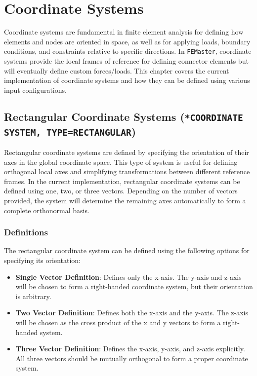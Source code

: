 \chapter{Coordinate Systems}
\label{chap:coordinate_systems}

Coordinate systems are fundamental in finite element analysis for defining how elements and nodes are oriented in space,
as well as for applying loads, boundary conditions, and constraints relative to specific directions.
In \texttt{FEMaster}, coordinate systems provide the local frames of reference for defining connector elements but will eventually define custom forces/loads.
This chapter covers the current implementation of coordinate systems and how they can be defined using various input configurations.

\section{Rectangular Coordinate Systems (\texttt{*COORDINATE SYSTEM, TYPE=RECTANGULAR})}

Rectangular coordinate systems are defined by specifying the orientation of their axes in the global coordinate space.
This type of system is useful for defining orthogonal local axes and simplifying transformations between different reference frames. In the current implementation, rectangular coordinate systems can be defined using one, two, or three vectors. Depending on the number of vectors provided, the system will determine the remaining axes automatically to form a complete orthonormal basis.

\subsection{Definitions}

The rectangular coordinate system can be defined using the following options for specifying its orientation:

\begin{itemize}
    \item \textbf{Single Vector Definition}: Defines only the x-axis. The y-axis and z-axis will be chosen to form a right-handed coordinate system, but their orientation is arbitrary.
    \item \textbf{Two Vector Definition}: Defines both the x-axis and the y-axis. The z-axis will be chosen as the cross product of the x and y vectors to form a right-handed system.
    \item \textbf{Three Vector Definition}: Defines the x-axis, y-axis, and z-axis explicitly. All three vectors should be mutually orthogonal to form a proper coordinate system.
\end{itemize}

